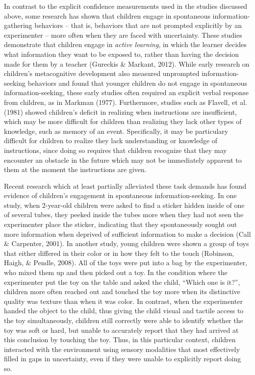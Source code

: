 \documentclass[floatsintext,man]{apa6}
\theoremstyle{definition}
\theoremstyle{definition}
\theoremstyle{definition}
\theoremstyle{remark}
\begin{document}
In contrast to the explicit confidence measurements used in the studies
discussed above, some research has shown that children engage in
spontaneous information-gathering behaviors -- that is, behaviors that
are not prompted explicitly by an experimenter -- more often when they
are faced with uncertainty. These studies demonstrate that children
engage in \emph{active learning}, in which the learner decides what
information they want to be exposed to, rather than having the decision
made for them by a teacher (Gureckis \& Markant, 2012). While early
research on children's metacognitive development also measured
unprompted information-seeking behaviors and found that younger children
do not engage in spontaneous information-seeking, these early studies
often required an explicit verbal response from children, as in Markman
(1977). Furthermore, studies such as Flavell, et al. (1981) showed
children's deficit in realizing when instructions are insufficient,
which may be more difficult for children than realizing they lack other
types of knowledge, such as memory of an event. Specifically, it may be
particulary difficult for children to realize they lack understanding or
knowledge of instructions, since doing so requires that children
recognize that they may encounter an obstacle in the future which may
not be immediately apparent to them at the moment the instructions are
given.

Recent research which at least partially alleviated these task demands
has found evidence of children's engagement in spontaneous
information-seeking. In one study, when 2-year-old children were asked
to find a sticker hidden inside of one of several tubes, they peeked
inside the tubes more when they had not seen the experimenter place the
sticker, indicating that they spontaneously sought out more information
when deprived of sufficient information to make a decision (Call \&
Carpenter, 2001). In another study, young children were shown a group of
toys that either differed in their color or in how they felt to the
touch (Robinson, Haigh, \& Pendle, 2008). All of the toys were put into
a bag by the experimenter, who mixed them up and then picked out a toy.
In the condition where the experimenter put the toy on the table and
asked the child, \enquote{Which one is it?}, children more often reached
out and touched the toy more when its distinctive quality was texture
than when it was color. In contrast, when the experimenter handed the
object to the child, thus giving the child visual and tactile access to
the toy simultaneously, children still correctly were able to identify
whether the toy was soft or hard, but unable to accurately report that
they had arrived at this conclusion by touching the toy. Thus, in this
particular context, children interacted with the environment using
sensory modalities that most effectively filled in gaps in uncertainty,
even if they were unable to explicitly report doing so.
\end{document}
